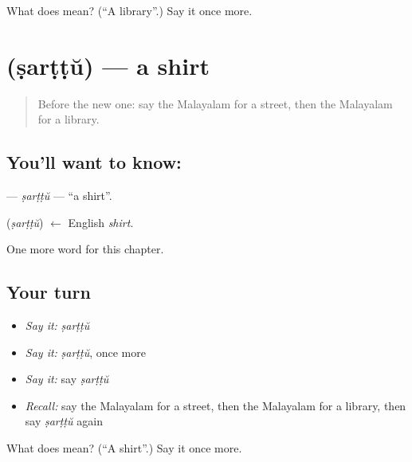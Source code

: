 \begin{tcolorbox}[breakable,colback=teal!4,colframe=teal!35!black,title={Before you move on}]
What does  mean? (\textquotedblleft{}A library\textquotedblright{}.) Say it once more.
\end{tcolorbox}
\section[\texorpdfstring{\ml{ഷർട്ട്} (ṣarṭṭŭ)}{ഷർട്ട് (ṣarṭṭŭ)}]{ (ṣarṭṭŭ) — a shirt}

\label{lesson:ML-C155-sarttu}



\begin{quote}
Before the new one: say the Malayalam for a street, then the Malayalam for a library.
\end{quote}

\subsection*{You'll want to know: }
\textbf{} — \emph{ṣarṭṭŭ} — \textquotedblleft{}a shirt\textquotedblright{}.

\begin{cousinweb}
\textbf{} (\emph{ṣarṭṭŭ}) $\leftarrow$ English \emph{shirt}.
\end{cousinweb}

\begin{grammarlens}[title={What you've built}]
One more word for this chapter.
\end{grammarlens}

\subsection*{Your turn}
\begin{itemize}
\raggedright
  \item \emph{Say it:} \emph{ṣarṭṭŭ}
  \item \emph{Say it:} \emph{ṣarṭṭŭ}, once more
  \item \emph{Say it:} say \emph{ṣarṭṭŭ}
  \item \emph{Recall:} say the Malayalam for a street, then the Malayalam for a library, then say \emph{ṣarṭṭŭ} again
\end{itemize}

\begin{tcolorbox}[breakable,colback=teal!4,colframe=teal!35!black,title={Before you move on}]
What does  mean? (\textquotedblleft{}A shirt\textquotedblright{}.) Say it once more.
\end{tcolorbox}
